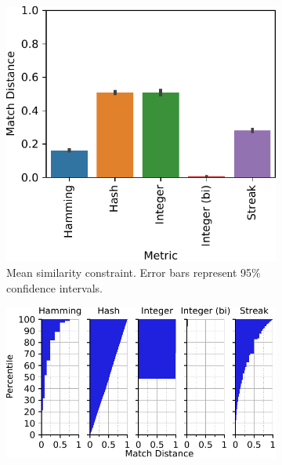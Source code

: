 \begin{figure}
\begin{center}
\begin{subfigure}[b]{\linewidth}
\begin{minipage}{0.6\linewidth}
\includegraphics[width=\linewidth]{img/sphere/bitweight=0dot5+seed=1+title=dimensionality_barplot+_data_hathash_hash=c0f6c5cf854ff253+_script_fullcat_hash=03ce1e318a24a109+ext=}
\end{minipage}
\begin{minipage}{0.35\linewidth}
\caption{
Mean similarity constraint.
Error bars represent 95\% confidence intervals.
}
\label{fig:sphere_barplot}
\end{minipage}
\end{subfigure}
\begin{minipage}{\linewidth}
\begin{subfigure}[b]{\linewidth}
\centering
\includegraphics[width=\linewidth]{img/sphere/bitweight=0dot5+seed=1+title=dimensionality_distnplot+_data_hathash_hash=c0f6c5cf854ff253+_script_fullcat_hash=bea2a31376bf6bd0+ext=}

\end{subfigure}
\end{minipage}
\end{center}
\end{figure}
